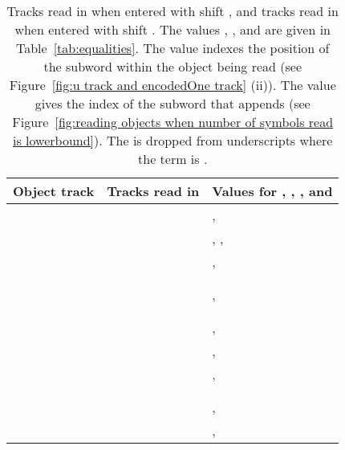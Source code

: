 \documentclass[11pt]{article} \usepackage{amsfonts,amsmath,amssymb,amsthm}
\begin{document}
\setlength{\extrarowheight}{6pt}
\begin{table*}[!ht]
\centering
\begin{tabular}{@{}c|l|l@{\;}}
 Object track  & Tracks read in  & Values for , , , and  
 \\ \hline
					& & ,\;\;\;\;   
\\ \cline{2-3}
					& & ,\;\;\;\; , 
\\ \cline{2-3}
	&  & ,\;\;\;\; 
\\\cline{2-3}\vspace{-4pt}
		& &  \\
		&&  
\\ \cline{2-3} 
	& &  ,\;\;\;\; 
\\\cline{2-3}\vspace{-4pt}
					& & 
\\
					&&
\\
\Xhline{2\arrayrulewidth}

 
					& & ,\;\;\;\;  
\\  \cline{2-3}
					& & ,\;\;\;\;  
\\\cline{2-3}
		&  & ,\;\;\;\; 
\\\cline{2-3} \vspace{-4pt}
		& &  
\\ 
		& &
\\\cline{2-3}
		& &  ,\;\;\;\; 
\\\cline{2-3}
					& & ,\;\;\;\; 
\\
\hline

\end{tabular}
\caption{Tracks read in  when entered with shift , and tracks read in  when entered with shift . The values , , and  are given in Table~\ref{tab:equalities}. The value  indexes the position of the  subword within the object being read (see Figure~\ref{fig:u track and encodedOne track} (ii)). The value  gives the index of the  subword that appends  (see Figure~\ref{fig:reading objects when number of symbols read is lowerbound}). The  is dropped from underscripts where the term is  .}\label{tab:Tracks in u for Case 2a}
\end{table*}   
\end{document}
